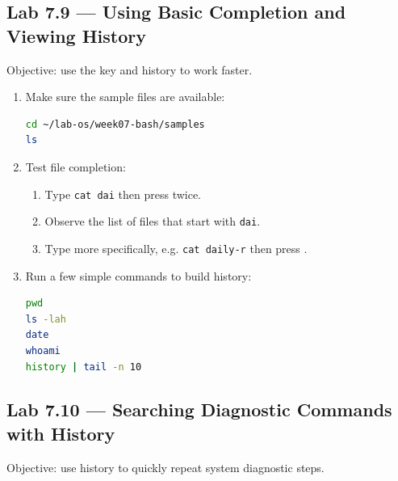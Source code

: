 \subsection*{Lab 7.9 --- Using Basic Completion and Viewing History}

Objective: use the  key and history to work faster.

\begin{enumerate}
  \item Make sure the sample files are available:
\begin{lstlisting}[language=bash, caption={Preparing files for completion}]
cd ~/lab-os/week07-bash/samples
ls
\end{lstlisting}

  \item Test file completion:
  \begin{enumerate}
    \item Type \texttt{cat dai} then press  twice.
    \item Observe the list of files that start with \texttt{dai}.
    \item Type more specifically, e.g. \texttt{cat daily-r} then press
      .
  \end{enumerate}

  \item Run a few simple commands to build history:
\begin{lstlisting}[language=bash, caption={Running commands to populate history}]
pwd
ls -lah
date
whoami
history | tail -n 10
\end{lstlisting}
\end{enumerate}

\subsection*{Lab 7.10 --- Searching Diagnostic Commands with History}

Objective: use history to quickly repeat system diagnostic steps.

